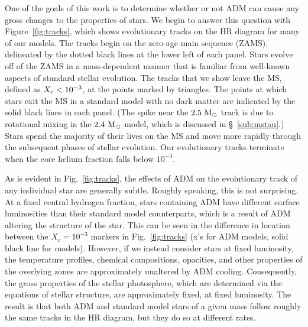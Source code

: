 \documentclass[useAMS,usenatbib]{mnras}
\begin{document}
One of the goals of this work is to determine whether or 
not ADM can cause any gross changes to the properties of 
stars. We begin to answer this question with 
Figure~\ref{fig:tracks}, 
which shows evolutionary tracks on the 
HR diagram for many of our models. The tracks begin on the 
zero-age main sequence (ZAMS), delineated by the dotted 
black lines at the lower left of each panel. 
Stars evolve off of the ZAMS in a mass-dependent manner that is 
familiar from well-known aspects of standard stellar evolution. 
The tracks that we show leave the MS, defined as $X_{\rm c} < 10^{-3}$, 
at the points marked by triangles. The points at which stars exit  
the MS in a standard model with no dark matter are indicated by 
the solid black lines in each panel. (The spike near the $2.5 \ \mathrm{M}_{\odot}$ track is due to rotational mixing in the $2.4 \ \mathrm{M}_{\odot}$ model, which is discussed in \S~\ref{sub:mstau}.) Stars spend the majority of 
their lives on the MS and move more rapidly through the subsequent 
phases of stellar evolution. Our evolutionary tracks terminate 
when the core helium fraction falls below $10^{-3}$.


As is evident in Fig.~\ref{fig:tracks}, 
the effects of ADM on the evolutionary track 
of any individual star are generally subtle. 
Roughly speaking, this is not surprising. 
At a fixed central hydrogen fraction, stars containing ADM have different surface luminosities than their standard model counterparts, which is a result of ADM altering the structure of the star. This can be seen in the difference in location between the $X_c=10^{-3}$ markers in Fig.~\ref{fig:tracks} (x's for ADM models, solid black line for \nodm models).
However, if we instead consider stars at fixed luminosity, the temperature profiles, chemical compositions, 
opacities, and other properties of the overlying zones 
are approximately unaltered by ADM cooling. Consequently, 
the gross properties of the stellar photosphere, which are 
determined via the equations of stellar structure, are 
approximately fixed, at fixed luminosity. 
The result is that both ADM and standard model stars of a given mass follow roughly the same tracks in the HR diagram, but they do so at different rates.
\end{document}
